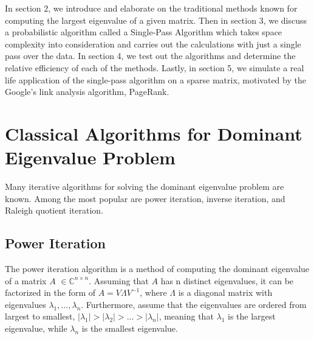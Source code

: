 \documentclass[11pt]{amsart}
\begin{document}
In section 2, we introduce and elaborate on the traditional methods known for computing the largest eigenvalue of a given matrix. Then in section 3, we discuss a probabilistic algorithm called a Single-Pass Algorithm which takes space complexity into consideration and carries out the calculations with just a single pass over the data. In section 4, we test out the algorithms and determine the relative efficiency of each of the methods. Lastly, in section 5, we simulate a real life application of the single-pass algorithm on a sparse matrix, motivated by the Google's link analysis algorithm, PageRank. 

\section{Classical Algorithms for Dominant Eigenvalue Problem}
Many iterative algorithms for solving the dominant eigenvalue problem are known. Among the most popular are power iteration, inverse iteration, and Raleigh quotient iteration. 

\subsection{Power Iteration}

The power iteration algorithm is a method of computing the dominant eigenvalue of a matrix $A$ $\in \mathbb{C}^{n \times n}$. Assuming that $A$ has n distinct eigenvalues, it can be factorized in the form of $A = V \Lambda V^{-1}$, where $\Lambda$ is a diagonal matrix with eigenvalues $\lambda_1 ,..., \lambda_n$. Furthermore, assume that the eigenvalues are ordered from largest to smallest, $|\lambda_1| > |\lambda_2| > ... > |\lambda_n|$, meaning that $\lambda_1$ is the largest eigenvalue, while $\lambda_n$ is the smallest eigenvalue.
\end{document}

